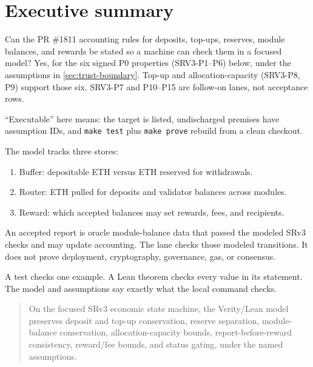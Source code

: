 \section{Executive summary}
\label{sec:executive-summary}

\begin{notebox}
Can the PR \#1811 accounting rules for deposits, top-ups, reserves, module
balances, and rewards be stated so a machine can check them in a focused
model? Yes, for the six signed P0 properties (SRV3-P1--P6) below, under the
assumptions in \cref{sec:trust-boundary}. Top-up and allocation-capacity
(SRV3-P8, P9) support those six. SRV3-P7 and P10--P15 are follow-on lanes,
not acceptance rows.
\end{notebox}

\noindent ``Executable'' here means: the target is listed, undischarged premises
have assumption IDs, and \texttt{make test} plus \texttt{make prove} rebuild
from a clean checkout.

The model tracks three stores:

\begin{enumerate}
  \item Buffer: depositable ETH versus ETH reserved for withdrawals.
  \item Router: ETH pulled for deposits and validator balances across modules.
  \item Reward: which accepted balances may set rewards, fees, and recipients.
\end{enumerate}

\noindent An accepted report is oracle module-balance data that passed the
modeled SRv3 checks and may update accounting. The lane checks those modeled
transitions. It does not prove deployment, cryptography, governance, gas, or
consensus.

\begin{notebox}
A test checks one example. A Lean theorem checks every value in its statement.
The model and assumptions say exactly what the local command checks.
\end{notebox}

\begin{quote}
On the focused SRv3 economic state machine, the Verity/Lean model preserves
deposit and top-up conservation, reserve separation, module-balance
conservation, allocation-capacity bounds, report-before-reward consistency,
reward/fee bounds, and status gating, under the named assumptions.
\end{quote}

